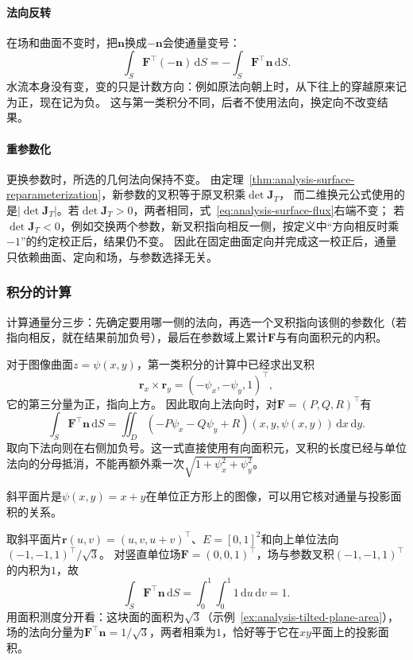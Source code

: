 \paragraph{法向反转}

在场和曲面不变时，把$\bm n$换成$-\bm n$会使通量变号：
\[
 \int_S\bm F^\top(-\bm n)\,\mathrm dS
 =-\int_S\bm F^\top\bm n\,\mathrm dS.
\]
水流本身没有变，变的只是计数方向：例如原法向朝上时，从下往上的穿越原来记为正，现在记为负。
这与第一类积分不同，后者不使用法向，换定向不改变结果。

\paragraph{重参数化}

更换参数时，所选的几何法向保持不变。
由定理~\ref{thm:analysis-surface-reparameterization}，新参数的叉积等于原叉积乘$\det\bm J_T$，
而二维换元公式使用的是$|\det\bm J_T|$。若$\det\bm J_T>0$，两者相同，式~\eqref{eq:analysis-surface-flux}右端不变；
若$\det\bm J_T<0$，例如交换两个参数，新叉积指向相反一侧，按定义中“方向相反时乘$-1$”的约定校正后，结果仍不变。
因此在固定曲面定向并完成这一校正后，通量只依赖曲面、定向和场，与参数选择无关。

\subsubsection{积分的计算}

计算通量分三步：先确定要用哪一侧的法向，再选一个叉积指向该侧的参数化（若指向相反，就在结果前加负号），最后在参数域上累计$\bm F$与有向面积元的内积。

对于图像曲面$z=\psi(x,y)$，第一类积分的计算中已经求出叉积
\[
 \bm r_x\times\bm r_y=(-\psi_x,-\psi_y,1)^\top,
\]
它的第三分量为正，指向上方。
因此取向上法向时，对$\bm F=(P,Q,R)^\top$有
\[
 \int_S\bm F^\top\bm n\,\mathrm dS
 =\iint_D(-P\psi_x-Q\psi_y+R)(x,y,\psi(x,y))\,\mathrm dx\,\mathrm dy.
\]
取向下法向则在右侧加负号。这一式直接使用有向面积元，叉积的长度已经与单位法向的分母抵消，不能再额外乘一次$\sqrt{1+\psi_x^2+\psi_y^2}$。

斜平面片是$\psi(x,y)=x+y$在单位正方形上的图像，可以用它核对通量与投影面积的关系。

\begin{example}[竖直单位场穿过斜平面片]
\label{ex:analysis-tilted-plane-flux}
取斜平面片$\bm r(u,v)=(u,v,u+v)^\top$、$E=[0,1]^2$和向上单位法向$(-1,-1,1)^\top/\sqrt3$。
对竖直单位场$\bm F=(0,0,1)^\top$，场与参数叉积$(-1,-1,1)^\top$的内积为$1$，故
\[
 \int_S\bm F^\top\bm n\,\mathrm dS
 =\int_0^1\int_0^1 1\,\mathrm du\,\mathrm dv=1.
\]
用面积测度分开看：这块面的面积为$\sqrt3$（示例~\ref{ex:analysis-tilted-plane-area}），场的法向分量为$\bm F^\top\bm n=1/\sqrt3$，两者相乘为$1$，恰好等于它在$xy$平面上的投影面积。
\end{example}


